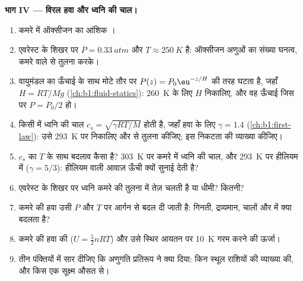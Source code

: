 \begin{problem}
\medskip
\noindent\textbf{भाग IV --- विरल हवा और ध्वनि की चाल।}
\begin{enumerate}[resume]
  \item कमरे में ऑक्सीजन का आंशिक ।
  \item एवरेस्ट के शिखर पर $P = \qty{0.33}{atm}$ और $T \approx \qty{250}{K}$ है:
        ऑक्सीजन अणुओं का संख्या घनत्व, कमरे वाले से तुलना करके।
  \item वायुमंडल का  ऊँचाई के साथ मोटे तौर पर
        $P(z) = P_0\eu^{-z/H}$ की तरह घटता है, जहाँ $H = RT/Mg$ (\cref{ch:b1:fluid-statics}):
        \qty{260}{K} के लिए $H$ निकालिए, और वह ऊँचाई जिस पर $P = P_0/2$ हो।
  \item किसी  में ध्वनि की चाल $c_s = \sqrt{\gamma RT/M}$ होती
        है, जहाँ हवा के लिए $\gamma = 1.4$ (\cref{ch:b1:first-law}): उसे
        \qty{293}{K} पर निकालिए और  से तुलना कीजिए; इस
        निकटता की व्याख्या कीजिए।
  \item $c_s$ का $T$ के साथ बदलाव कैसा है? \qty{303}{K} पर कमरे में ध्वनि
        की चाल, और \qty{293}{K} पर हीलियम में ($\gamma = 5/3$): हीलियम
        वाली आवाज़ ऊँची क्यों सुनाई देती है?
  \item एवरेस्ट के शिखर पर ध्वनि कमरे की तुलना में तेज़ चलती है या धीमी?
        कितनी?
  \item कमरे की हवा उसी $P$ और $T$ पर आर्गन से बदल दी जाती है: गिनती,
        द्रव्यमान, चालों और  में क्या बदलता है?
  \item कमरे की हवा की  ($U = \tfrac52 nRT$) और उसे स्थिर
        आयतन पर \qty{10}{K} गरम करने की ऊर्जा।
  \item तीन पंक्तियों में सार दीजिए कि अणुगति प्रतिरूप ने क्या दिया: किन
        स्थूल राशियों की व्याख्या की, और किस एक सूक्ष्म औसत से।
\end{enumerate}
\end{problem}
